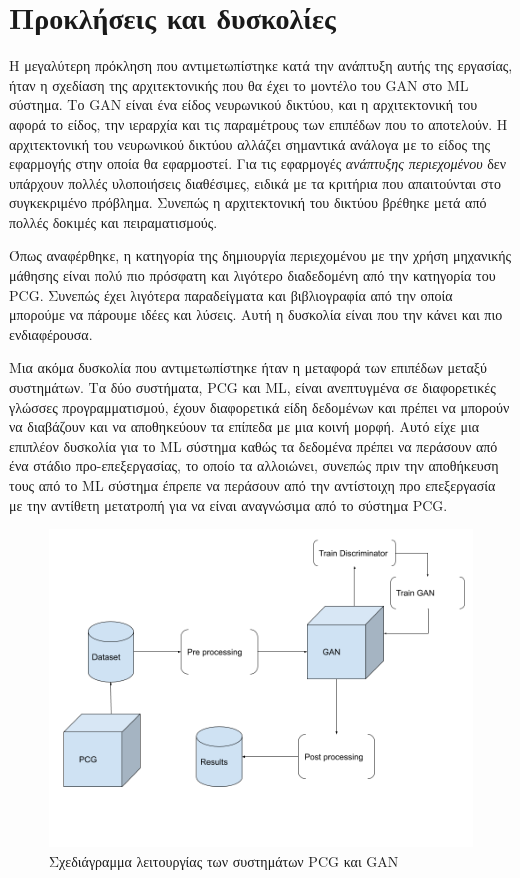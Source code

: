 \section{Προκλήσεις και δυσκολίες}
\par
Η μεγαλύτερη πρόκληση που αντιμετωπίστηκε κατά την ανάπτυξη αυτής της εργασίας, ήταν η σχεδίαση της αρχιτεκτονικής που θα έχει το μοντέλο του GAN στο ML σύστημα. Το GAN είναι ένα είδος νευρωνικού δικτύου, και η αρχιτεκτονική του αφορά το είδος, την ιεραρχία και τις παραμέτρους των επιπέδων που το αποτελούν. Η αρχιτεκτονική του νευρωνικού δικτύου αλλάζει σημαντικά ανάλογα με το είδος της εφαρμογής στην οποία θα εφαρμοστεί. Για τις εφαρμογές \textit{ανάπτυξης περιεχομένου} δεν υπάρχουν πολλές υλοποιήσεις διαθέσιμες, ειδικά με τα κριτήρια που απαιτούνται στο συγκεκριμένο πρόβλημα. Συνεπώς η αρχιτεκτονική του δικτύου βρέθηκε μετά από πολλές δοκιμές και πειραματισμούς.
\par
Όπως αναφέρθηκε, η κατηγορία της δημιουργία περιεχομένου με την χρήση μηχανικής μάθησης είναι πολύ πιο πρόσφατη και λιγότερο διαδεδομένη από την κατηγορία του PCG. Συνεπώς έχει λιγότερα παραδείγματα και βιβλιογραφία από την οποία μπορούμε να πάρουμε ιδέες και λύσεις. Αυτή η δυσκολία είναι που την κάνει και πιο ενδιαφέρουσα.
\par
Μια ακόμα δυσκολία που αντιμετωπίστηκε ήταν η μεταφορά των επιπέδων μεταξύ συστημάτων. Τα δύο συστήματα, PCG και ML, είναι ανεπτυγμένα σε διαφορετικές γλώσσες προγραμματισμού, έχουν διαφορετικά είδη δεδομένων και πρέπει να μπορούν να διαβάζουν και να αποθηκεύουν τα επίπεδα με μια κοινή μορφή. Αυτό είχε μια επιπλέον δυσκολία για το ML σύστημα καθώς τα δεδομένα πρέπει να περάσουν από ένα στάδιο προ-επεξεργασίας, το οποίο τα αλλοιώνει, συνεπώς πριν την αποθήκευση τους από το ML σύστημα έπρεπε να περάσουν από την αντίστοιχη προ επεξεργασία με την αντίθετη μετατροπή για να είναι αναγνώσιμα από το σύστημα PCG.

\begin{figure}[H]
\centering
\includegraphics[width=.8\linewidth]{../images/graphs/Data_Cycle.png}
\caption{Σχεδιάγραμμα λειτουργίας των συστημάτων PCG και GAN}
\label{fig:fig}
\end{figure}




